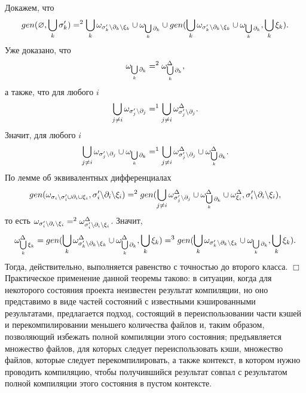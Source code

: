 Докажем, что $$gen(\varnothing, \bigcup\limits_k {\sigma^\prime_k}) =^2 \bigcup\limits_k \omega_{{\sigma^\prime_k}{\setminus}{\partial_k}{\setminus}{\xi_k}} \cup \omega_{\bigcup\limits_k \partial_k} \cup gen(\bigcup\limits_k \omega_{{\sigma^\prime_k}{\setminus}{\partial_k}{\setminus}{\xi_k}} \cup \omega_{\bigcup\limits_k \partial_k}, \bigcup\limits_k {\xi_k}).$$ 
Уже доказано, что $$\omega_{\bigcup\limits_k {\partial_k}} =^2 \omega^\Delta_{\bigcup\limits_k {\partial_k}},$$ 
а также, что для любого $i$ $$\bigcup\limits_{j \neq i} \omega_{{\sigma^\prime_j}{\setminus}{\partial_j}} =^1 \bigcup\limits_{j \neq i} \omega^\Delta_{{\sigma^\prime_j}{\setminus}{\partial_j}}.$$ 
Значит, для любого $i$ $$\bigcup\limits_{j \neq i} \omega_{{\sigma^\prime_j}{\setminus}{\partial_j}} \cup \omega_{\bigcup\limits_k {\partial_k}} =^1 \bigcup\limits_{j \neq i} \omega^\Delta_{{\sigma^\prime_j}{\setminus}{\partial_j}} \cup \omega^\Delta_{\bigcup\limits_k {\partial_k}}.$$ 
По лемме об эквивалентных дифференциалах $$gen(\omega_{{\sigma_i}{\setminus}{\sigma^\prime_i} \cup {\partial_i} \cup {\xi_i}}, {\sigma^\prime_i}{\setminus}{\partial_i}{\setminus}{\xi_i}) =^2 gen(\bigcup\limits_{j \neq i} \omega^\Delta_{{\sigma^\prime_j}{\setminus}{\partial_j}} \cup \omega^\Delta_{\bigcup\limits_k {\partial_k}} \cup \omega^\Delta_{\xi_i}, {\sigma^\prime_i}{\setminus}{\partial_i}{\setminus}{\xi_i}),$$ 
то есть $\omega_{{\sigma^\prime_i}{\setminus}{\partial_i}{\setminus}{\xi_i}} =^2 \omega^\Delta_{{\sigma^\prime_i}{\setminus}{\partial_i}{\setminus}{\xi_i}}$. Значит, $$\omega^\Delta_{\bigcup\limits_k {\xi_k}} = gen(\bigcup\limits_k \omega^\Delta_{{\sigma^\prime_k}{\setminus}{\partial_k}{\setminus}{\xi_k}} \cup \omega^\Delta_{\bigcup\limits_k {\partial_k}}, \bigcup\limits_k {\xi_k}) =^3 gen(\bigcup\limits_k \omega_{{\sigma^\prime_k}{\setminus}{\partial_k}{\setminus}{\xi_k}} \cup \omega_{\bigcup\limits_k {\partial_k}}, \bigcup\limits_k {\xi_k}).$$ 
Тогда, действительно, выполняется равенство с точностью до второго класса. $\Box$\\

Практическое применение данной теоремы таково: в ситуации, когда для некоторого состояния проекта неизвестен результат компиляции, но оно представимо в виде частей состояний с известными кэшированными результатами, предлагается подход, состоящий в переиспользовании части кэшей и перекомпилировании меньшего количества файлов и, таким образом, позволяющий избежать полной компиляции этого состояния; предъявляется множество файлов, для которых следует переиспользовать кэши, множество файлов, которые следует перекомпилировать, а также контекст, в котором нужно проводить компиляцию, чтобы получившийся результат совпал с результатом полной компиляции этого состояния в пустом контексте.